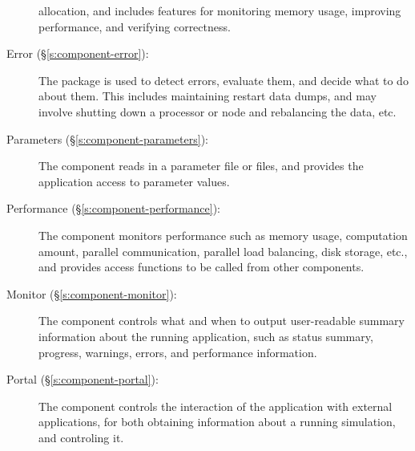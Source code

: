 \begin{description}
        allocation, and includes features for monitoring memory usage,
        improving performance, and verifying correctness.
%
 \item [Error (\S\ref{s:component-error}): ]
%
        The  package is used to detect errors, evaluate
        them, and decide what to do about them.  This includes
        maintaining restart data dumps, and may involve shutting down
        a processor or node and rebalancing the data, etc.
%
 \item [Parameters (\S\ref{s:component-parameters}): ]
%
        The  component
        reads in a parameter file or files, and provides the
        application access to parameter values.
%
%
 \item [Performance (\S\ref{s:component-performance}): ]
%
        The  component monitors performance such as
        memory usage, computation amount, parallel communication,
        parallel load balancing, disk storage, etc., and provides
        access functions to be called from other components.
%
 \item [Monitor (\S\ref{s:component-monitor}): ]
%
        The  component controls what and when to output
        user-readable summary information about the running
        application, such as status summary, progress, warnings,
        errors, and performance information.
%
 \item [Portal (\S\ref{s:component-portal}): ]
%
        The  component controls the interaction of the
        application with external applications, for both obtaining
        information about a running simulation, and controling it.
\end{description}





















% 
% 
% 
% 
% 
% 
% 
% 
% 
% 
